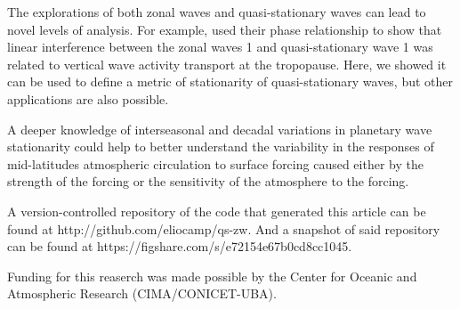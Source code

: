 \documentclass[draft,linenumbers]{agujournal2018}
\begin{document}
The explorations of both zonal waves and quasi-stationary waves can lead
to novel levels of analysis. For example, \citet{smith2012} used their
phase relationship to show that linear interference between the zonal
waves 1 and quasi-stationary wave 1 was related to vertical wave
activity transport at the tropopause. Here, we showed it can be used to
define a metric of stationarity of quasi-stationary waves, but other
applications are also possible.

A deeper knowledge of interseasonal and decadal variations in planetary
wave stationarity could help to better understand the variability in the
responses of mid-latitudes atmospheric circulation to surface forcing
caused either by the strength of the forcing or the sensitivity of the
atmosphere to the forcing.

\acknowledgments

A version-controlled repository of the code that generated this article
can be found at http://github.com/eliocamp/qs-zw. And a snapshot of said
repository can be found at https://figshare.com/s/e72154e67b0cd8cc1045.

Funding for this reaserch was made possible by the Center for Oceanic
and Atmospheric Research (CIMA/CONICET-UBA).


\end{document}
